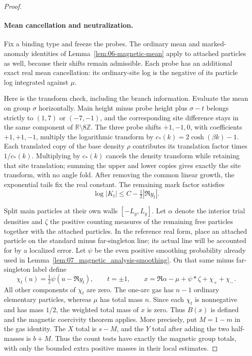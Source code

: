 \begin{proof}
\paragraph{Mean cancellation and neutralization.}
Fix a binding type and freeze the probes.  The ordinary mean and
marked-anomaly identities of Lemma~\ref{lem:06-magnetic-mean}
apply to attached particles as well, because their shifts remain
admissible.  Each probe has an additional exact real mean cancellation:
its ordinary-site log is the negative of its particle log integrated
against $\mu$.

Here is the transform check, including the branch information.
Evaluate the mean on group $\sigma$ horizontally.  Main height minus
probe height plus $\sigma-t$ belongs strictly to $(1,7)$ or
$(-7,-1)$, and the corresponding site difference stays in the same
component of $\mathbb R\setminus8\mathbb Z$.  The three probe
shifts $+1,-1,0$, with coefficients $+1,+1,-1$, multiply the
logarithmic transform by
$c_*(k)=2\cosh(\beta k)-1$.  Each translated copy of the base density $\rho$ contributes its
translation factor times $1/c_*(k)$.  Multiplying by $c_*(k)$
cancels the density transform while retaining that site translation;
summing the upper and lower copies gives exactly the site transform,
with no angle fold.  After removing the common linear growth, the exponential
tails fix the real constant.  The remaining mark factor satisfies
\begin{equation}
                 \log|K_t|\le C-\tfrac12|\Re y_t|.
\label{eq:one-arc-probe-tail}
\end{equation}

Split main particles at their own walls $[-L_g,L_g]$.
Let $\alpha$ denote the interior trial densities and $\zeta$ the
positive counting measures of the remaining free particles together
with the attached particles.  In the reference real form, place an
attached particle on the standard minus far-singleton line; its actual
line will be accounted for by a localized error.  Let $\psi$ be the
even positive smoothing probability already used in
Lemma~\ref{lem:07_magnetic_analysis-smoothing}.  On that same minus
far-singleton label define
\[
 \chi_t(u)=\tfrac12\psi(u-\Re y_t),\qquad t=\pm1,
 \qquad
 x=\Re\alpha-\mu+\psi*\zeta+\chi_++\chi_-.
\]
All other components of $\chi_t$ are zero.  The one-arc gas has
$n-1$ ordinary elementary particles, whereas $\mu$ has total mass
$n$.  Since each $\chi_t$ is nonnegative and has mass $1/2$, the
weighted total mass of $x$ is zero.  Thus $B(x)$ is defined and the
magnetic coercivity theorem applies.  More precisely, put $M=1-m$ in the gas identity.  The $X$ total
is $s-M$, and the $Y$ total after adding the two half-masses is
$b+M$.  Thus the count tests have exactly the magnetic group totals,
with only the bounded extra positive masses in their local estimates.


\end{proof}
